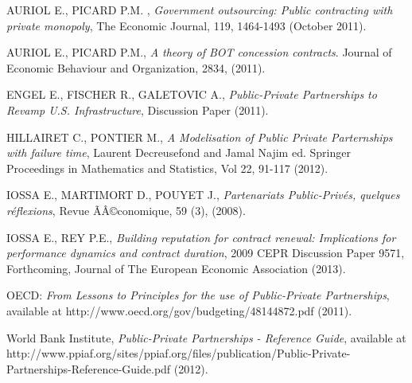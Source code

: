 \documentclass{svjour3}
\begin{document}
\begin{thebibliography}{2001}   AURIOL E., PICARD P.M. , {\it   Government outsourcing: Public contracting with private monopoly}, The Economic Journal,  119,  1464-1493
 (October 2011).

 AURIOL E., PICARD  P.M., {\it   A theory of BOT concession contracts}. Journal of Economic Behaviour and Organization,  2834, (2011).

 ENGEL E., FISCHER R.,  GALETOVIC A.,  {\it   Public-Private Partnerships to Revamp U.S. Infrastructure}, Discussion Paper (2011).

  HILLAIRET C., PONTIER M.,  {\it    A Modelisation of Public Private Parternships with failure time}, 
Laurent Decreusefond and Jamal Najim ed.
Springer Proceedings in Mathematics and Statistics, Vol 22,
 91-117  (2012). 

   IOSSA E.,   MARTIMORT D.,  POUYET J.,  {\it    Partenariats Public-Priv\'es, quelques r\'eflexions}, Revue ÃÂ©conomique,  59 (3), (2008).

  IOSSA E.,  REY P.E., {\it  
Building reputation for contract renewal: Implications for performance dynamics and contract duration},
2009 CEPR Discussion Paper 9571,   Forthcoming, Journal of The European Economic Association (2013).

 OECD: {\it  From Lessons to Principles for the use of Public-Private Partnerships}, available at http://www.oecd.org/gov/budgeting/48144872.pdf  (2011).

 World Bank Institute, {\it   Public-Private Partnerships - Reference Guide},  available at http://www.ppiaf.org/sites/ppiaf.org/files/publication/Public-Private-Partnerships-Reference-Guide.pdf (2012).

\end{thebibliography}
\end{document}

